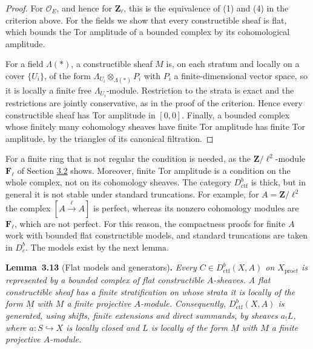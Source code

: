\documentclass[11pt]{article}
\newenvironment{bpstatement}[2]{\par\addvspace{0.6\baselineskip}\noindent\textbf{#1}#2\textbf{.}\enspace\ignorespaces}
  {\par\addvspace{0.4\baselineskip}}
\newenvironment{bpstatementit}[2]{\begin{bpstatement}{#1}{#2}\itshape\ignorespaces}{\end{bpstatement}}
\providecommand{\Dbc}{}\renewcommand{\Dbc}{D^b_c}
\begin{document}
\begin{proof}[{Proof}]\label{bp233}%
For \(\mathcal O_E\), and hence for \(\mathbf Z_\ell\), this is the equivalence of (1) and (4) in the criterion above. For the fields we show that every constructible sheaf is flat, which bounds the Tor amplitude of a bounded complex by its cohomological amplitude.

For a field \(\Lambda(*)\), a constructible sheaf \(M\) is, on each stratum and locally on a cover \(\{U_i\}\), of the form \(\Lambda_{U_i}\otimes_{\Lambda(*)}P_i\) with \(P_i\) a finite-dimensional vector space, so it is locally a finite free \(\Lambda_{U_i}\)-module. Restriction to the strata is exact and the restrictions are jointly conservative, as in the proof of the criterion. Hence every constructible sheaf has Tor amplitude in \([0,0]\). Finally, a bounded complex whose finitely many cohomology sheaves have finite Tor amplitude has finite Tor amplitude, by the triangles of its canonical filtration.
\end{proof}

\label{bp234}%
For a finite ring that is not regular the condition is needed, as the \(\mathbf Z/\ell^2\)-module \(\mathbf F_\ell\) of Section \hyperref[bp197]{3.2} shows. Moreover, finite Tor amplitude is a condition on the whole complex, not on its cohomology sheaves. The category \(D^b_{\mathrm{ctf}}\) is thick, but in general it is not stable under standard truncations. For example, for \(A=\mathbf Z/\ell^2\) the complex \([A\xrightarrow{\ell}A]\) is perfect, whereas its nonzero cohomology modules are \(\mathbf F_\ell\), which are not perfect. For this reason, the compactness proofs for finite \(A\) work with bounded flat constructible models, and standard truncations are taken in \(\Dbc\). The models exist by the next lemma.

\label{bp235}%
\begin{bpstatementit}{Lemma~3.13}{ (Flat models and generators)}
Every \(C\in D^b_{\mathrm{ctf}}(X,A)\) on \(X_{\mathrm{pro}\acute{e}t}\) is represented by a bounded complex of flat constructible \(A\)-sheaves. A flat constructible sheaf has a finite stratification on whose strata it is locally of the form \(\underline M\) with \(M\) a finite projective \(A\)-module. Consequently, \(D^b_{\mathrm{ctf}}(X,A)\) is generated, using shifts, finite extensions and direct summands, by sheaves \(a_!L\), where \(a:S\hookrightarrow X\) is locally closed and \(L\) is locally of the form \(\underline M\) with \(M\) a finite projective \(A\)-module.
\end{bpstatementit}
\end{document}
